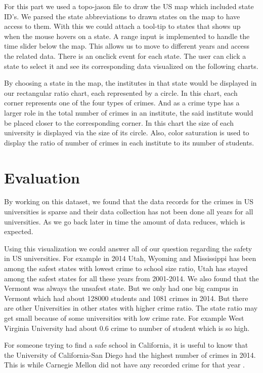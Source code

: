 \documentclass[12pt]{article}
\begin{document}
For this part we used a topo-jason file to draw the US map which included state ID's. We parsed the state abbreviations to drawn states on the map to have access to them. With this we could attach a tool-tip to states that shows up when the mouse hovers on a state. A range input is implemented to handle the time slider below the map. This allows us to move to different years and access the related data. There is an onclick event for each state. The user can click a state to select it and see its corresponding data visualized on the following charts.

By choosing a state in the map, the institutes in that state would be displayed in our rectangular ratio chart, each represented by a circle. In this chart, each corner represents one of the four types of crimes. And as a crime type has a larger role in the total number of crimes in an institute, the said institute would be placed closer to the corresponding corner. In this chart the size of each university is displayed via the size of its circle. Also, color saturation is used to display the ratio of number of crimes in each institute to its number of students.

\section{Evaluation}

By working on this dataset, we found that the data records for the crimes in US universities is sparse and their data collection has not been done all years for all universities. As we go back later in time the amount of data reduces, which is expected. 

Using this visualization we could answer all of our question regarding the safety in US universities. For example in 2014 Utah, Wyoming and Mississippi has been among the safest states with lowest crime to school size ratio, Utah has stayed among the safest states for all these years from 2001-2014. We also found that the Vermont was always the unsafest state. But we only had one big campus in Vermont which had about 128000 students and 1081 crimes in 2014. But there are other Universities in other states with higher crime ratio. The state ratio may get small because of some universities with low crime rate. For example West Virginia University had about 0.6 crime to number of student which is so high. 

For someone trying to find a safe school in California, it is useful to know that the University of California-San Diego had the highest number of crimes in 2014. This is while Carnegie Mellon did not have any recorded crime for that year .
\end{document}
